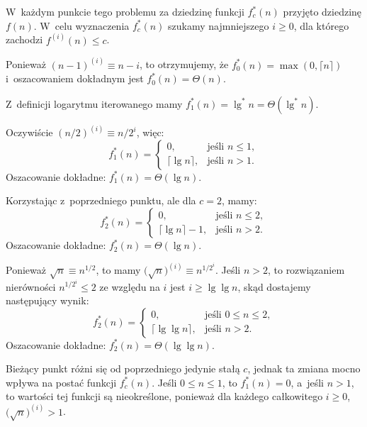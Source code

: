 W~każdym punkcie tego problemu za dziedzinę funkcji $f_c^*(n)$ przyjęto dziedzinę $f(n)$.
W~celu wyznaczenia $f_c^*(n)$ szukamy najmniejszego $i\ge0$, dla którego zachodzi $f^{(i)}(n)\le c$.

\subproblem %

\noindent Ponieważ $(n-1)^{(i)}\equiv n-i$, to otrzymujemy, że $f_0^*(n)=\max(0,\lceil n\rceil)$ i~oszacowaniem dokładnym jest $f_0^*(n)=\Theta(n)$.

\subproblem %

\noindent Z~definicji logarytmu iterowanego mamy $f_1^*(n)=\lg^*n=\Theta(\lg^*n)$.

\subproblem %
Oczywiście $(n/2)^{(i)}\equiv n/2^i$, więc:
\[
	f_1^*(n) =
	\begin{cases}
		0, & \text{jeśli $n\le1$}, \\
		\lceil\lg n\rceil, & \text{jeśli $n>1$}.
	\end{cases}
\]
Oszacowanie dokładne: $f_1^*(n)=\Theta(\lg n)$.

\subproblem %
Korzystając z~poprzedniego punktu, ale dla $c=2$, mamy:
\[
	f_2^*(n) =
	\begin{cases}
		0, & \text{jeśli $n\le2$}, \\
		\lceil\lg n\rceil-1, & \text{jeśli $n>2$}.
	\end{cases}
\]
Oszacowanie dokładne: $f_2^*(n)=\Theta(\lg n)$.

\subproblem %
Ponieważ $\sqrt{n}\equiv n^{1/2}$, to mamy $\bigl(\!\sqrt{n}\bigr)^{(i)}\equiv n^{1/2^i}$\!.
Jeśli $n>2$, to rozwiązaniem nierówności $n^{1/2^i}\le2$ ze względu na $i$ jest $i\ge\lg\lg n$, skąd dostajemy następujący wynik:
\[
	f_2^*(n) =
	\begin{cases}
		0, & \text{jeśli $0\le n\le2$}, \\
		\lceil\lg\lg n\rceil, & \text{jeśli $n>2$}.
	\end{cases}
\]
Oszacowanie dokładne: $f_2^*(n)=\Theta(\lg\lg n)$.

\subproblem %
Bieżący punkt różni się od poprzedniego jedynie stałą $c$, jednak ta zmiana mocno wpływa na postać funkcji $f_c^*(n)$.
Jeśli $0\le n\le1$, to $f_1^*(n)=0$, a~jeśli $n>1$, to wartości tej funkcji są nieokreślone, ponieważ dla każdego całkowitego $i\ge0$, $\bigl(\!\sqrt{n}\bigr)^{(i)}>1$.

